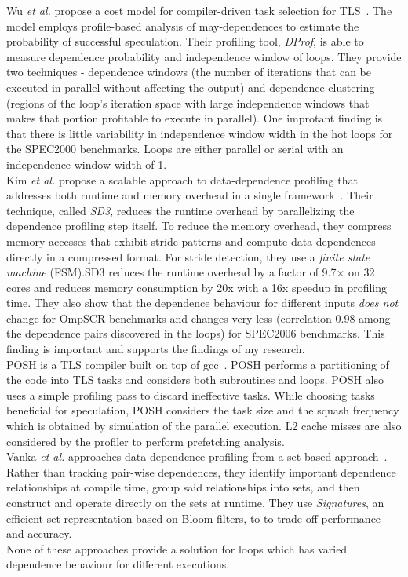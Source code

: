 \documentclass[10pt]{report}          %
\begin{document}
Wu \textit{et al.} propose a cost model for compiler-driven task selection for TLS~\cite{dprof}.  The model employs profile-based analysis of may-dependences to estimate the probability of successful speculation.  Their profiling tool, \textit{DProf}, is able to  measure dependence probability and independence window of loops. They provide two techniques - dependence windows (the number of iterations that can be executed in parallel without affecting the output) and dependence clustering (regions of the loop's iteration space with large independence windows that makes that portion profitable to execute in parallel).  One improtant finding is that there is little variability in independence window width in the hot loops for the SPEC2000 benchmarks. Loops are either parallel or serial with an independence window width of 1.\\
Kim \textit{et al.} propose a scalable approach to data-dependence profiling that addresses both runtime and memory overhead in a single framework~\cite{sd3}.  Their technique, called \textit{SD3}, reduces the runtime overhead by parallelizing the dependence profiling step itself. To reduce the memory overhead, they compress memory accesses that exhibit stride patterns and compute data dependences directly in a compressed format. For stride detection, they use a \textit{finite state machine} (FSM).SD3 reduces the runtime overhead by a factor of  9.7× on  32 cores and reduces memory consumption by 20x with a 16x speedup in profiling time.  They also show that the dependence behaviour for different inputs \textit{does not} change for OmpSCR benchmarks and changes very less (correlation 0.98 among the dependence pairs discovered in the loops) for SPEC2006 benchmarks.  This finding is important and supports the findings of my research.\\
POSH is a TLS compiler built on top of gcc~\cite{posh}. POSH performs a partitioning of the code into TLS tasks and considers both subroutines and loops. POSH also uses a simple profiling pass to discard ineffective tasks.  While choosing tasks beneficial for speculation, POSH considers the task size and the squash frequency which is obtained by simulation of the parallel execution.  L2 cache misses are also considered by the profiler to perform prefetching analysis.\\
Vanka \textit{et al.} approaches data dependence profiling from a set-based approach~\cite{vanka}.  Rather than tracking pair-wise dependences, they identify important dependence relationships at compile time, group said relationships into sets, and then construct and operate directly on the sets at runtime.  They use \textit{Signatures}, an efficient set representation based on Bloom filters, to to trade-off performance and accuracy.\\
None of these approaches provide a solution for loops which has varied dependence behaviour for different executions.
\end{document}
